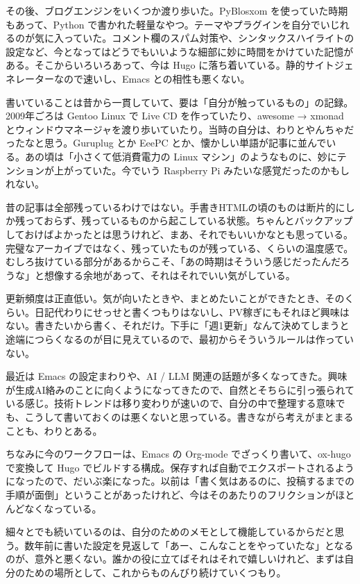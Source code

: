 \documentclass[11pt]{article}
\begin{document}
その後、ブログエンジンをいくつか渡り歩いた。PyBlosxom を使っていた時期もあって、Python で書かれた軽量なやつ。テーマやプラグインを自分でいじれるのが気に入っていた。コメント欄のスパム対策や、シンタックスハイライトの設定など、今となってはどうでもいいような細部に妙に時間をかけていた記憶がある。そこからいろいろあって、今は Hugo に落ち着いている。静的サイトジェネレーターなので速いし、Emacs との相性も悪くない。

書いていることは昔から一貫していて、要は「自分が触っているもの」の記録。2009年ごろは Gentoo Linux で Live CD を作っていたり、awesome → xmonad とウィンドウマネージャを渡り歩いていたり。当時の自分は、わりとやんちゃだったなと思う。Guruplug とか EeePC とか、懐かしい単語が記事に並んでいる。あの頃は「小さくて低消費電力の Linux マシン」のようなものに、妙にテンションが上がっていた。今でいう Raspberry Pi みたいな感覚だったのかもしれない。

昔の記事は全部残っているわけではない。手書きHTMLの頃のものは断片的にしか残っておらず、残っているものから起こしている状態。ちゃんとバックアップしておけばよかったとは思うけれど、まあ、それでもいいかなとも思っている。完璧なアーカイブではなく、残っていたものが残っている、くらいの温度感で。むしろ抜けている部分があるからこそ、「あの時期はそういう感じだったんだろうな」と想像する余地があって、それはそれでいい気がしている。

更新頻度は正直低い。気が向いたときや、まとめたいことができたとき、そのくらい。日記代わりにせっせと書くつもりはないし、PV稼ぎにもそれほど興味はない。書きたいから書く、それだけ。下手に「週1更新」なんて決めてしまうと途端につらくなるのが目に見えているので、最初からそういうルールは作っていない。

最近は Emacs の設定まわりや、AI / LLM 関連の話題が多くなってきた。興味が生成AI絡みのことに向くようになってきたので、自然とそちらに引っ張られている感じ。技術トレンドは移り変わりが速いので、自分の中で整理する意味でも、こうして書いておくのは悪くないと思っている。書きながら考えがまとまることも、わりとある。

ちなみに今のワークフローは、Emacs の Org-mode でざっくり書いて、ox-hugo で変換して Hugo でビルドする構成。保存すれば自動でエクスポートされるようになったので、だいぶ楽になった。以前は「書く気はあるのに、投稿するまでの手順が面倒」ということがあったけれど、今はそのあたりのフリクションがほとんどなくなっている。

細々とでも続いているのは、自分のためのメモとして機能しているからだと思う。数年前に書いた設定を見返して「あー、こんなことをやっていたな」となるのが、意外と悪くない。誰かの役に立てばそれはそれで嬉しいけれど、まずは自分のための場所として、これからものんびり続けていくつもり。
\end{document}
